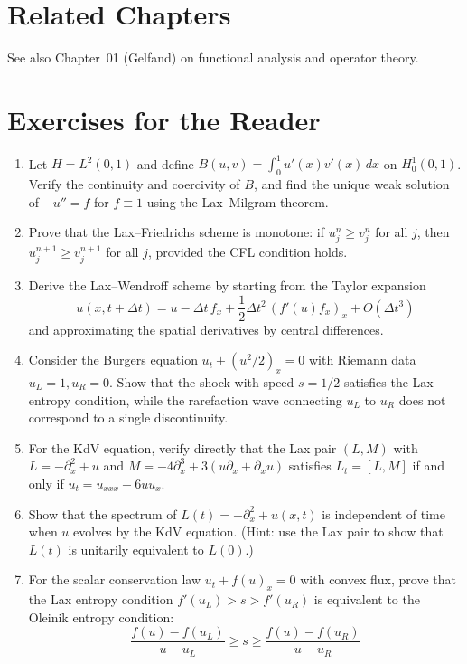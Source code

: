 \section{Related Chapters}
See also Chapter~01 (Gelfand) on functional analysis and operator theory.

\section*{Exercises for the Reader}

\begin{enumerate}
    \item [B] Let \(H = L^2(0,1)\) and define \(B(u,v) = \int_0^1 u'(x) v'(x) \,dx\) on \(H_0^1(0,1)\). Verify the continuity and coercivity of \(B\), and find the unique weak solution of \(-u'' = f\) for \(f \equiv 1\) using the Lax--Milgram theorem.
    \item [I] Prove that the Lax--Friedrichs scheme is monotone: if \(u_j^n \geq v_j^n\) for all \(j\), then \(u_j^{n+1} \geq v_j^{n+1}\) for all \(j\), provided the CFL condition holds.
    \item [I] Derive the Lax--Wendroff scheme by starting from the Taylor expansion
    \[
    u(x, t + \Delta t) = u - \Delta t\, f_x + \frac12 \Delta t^2\, (f'(u) f_x)_x + O(\Delta t^3)
    \]
    and approximating the spatial derivatives by central differences.
    \item [B] Consider the Burgers equation \(u_t + (u^2/2)_x = 0\) with Riemann data \(u_L = 1, u_R = 0\). Show that the shock with speed \(s = 1/2\) satisfies the Lax entropy condition, while the rarefaction wave connecting \(u_L\) to \(u_R\) does not correspond to a single discontinuity.
    \item [I] For the KdV equation, verify directly that the Lax pair \((L, M)\) with \(L = -\partial_x^2 + u\) and \(M = -4\partial_x^3 + 3(u\partial_x + \partial_x u)\) satisfies \(L_t = [L, M]\) if and only if \(u_t = u_{xxx} - 6uu_x\).
    \item [I] Show that the spectrum of \(L(t) = -\partial_x^2 + u(x,t)\) is independent of time when \(u\) evolves by the KdV equation. (Hint: use the Lax pair to show that \(L(t)\) is unitarily equivalent to \(L(0)\).)
    \item [I] For the scalar conservation law \(u_t + f(u)_x = 0\) with convex flux, prove that the Lax entropy condition \(f'(u_L) > s > f'(u_R)\) is equivalent to the Oleinik entropy condition:
    \[
    \frac{f(u) - f(u_L)}{u - u_L} \geq s \geq \frac{f(u) - f(u_R)}{u - u_R}
\]
\end{enumerate}
